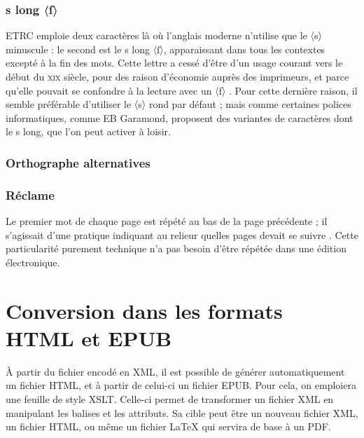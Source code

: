 \subsubsection{s long 〈ſ〉}
ETRC emploie deux caractères là où l'anglais moderne n'utilise que le 〈s〉 minuscule : le second est le s long 〈ſ〉, apparaissant dans tous les contextes excepté à la fin des mots.
Cette lettre a cessé d'être d'un usage courant vers le début du \textsc{xix}\ieme{} siècle, pour des raison d'économie auprès des imprimeurs, et parce qu'elle pouvait se confondre à la lecture avec un 〈f〉 \parencite{west_rules_2006}.
Pour cette dernière raison, il semble préférable d'utiliser le 〈s〉 rond par défaut ; mais comme certaines polices informatiques, comme EB Garamond, proposent des variantes de caractères dont le s long, que l'on peut activer à loisir.
\subsubsection{Orthographe alternatives}

\subsubsection{Réclame}
Le premier mot de chaque page est répété au bas de la page précédente ; il s'agissait d'une pratique indiquant au relieur quelles pages devait se suivre \parencite{roberts_catchword_1982}.
Cette particularité purement technique n'a pas besoin d'être répétée dans une édition électronique.
\section{Conversion dans les formats HTML et EPUB}\label{MethodConv}
À partir du fichier encodé en XML, il est possible de générer automatiquement un fichier HTML, et à partir de celui-ci un fichier EPUB.
Pour cela, on emploiera une feuille de style XSLT.
Celle-ci permet de transformer un fichier XML en manipulant les balises et les attributs.
Sa cible peut être un nouveau fichier XML, un fichier HTML, ou même un fichier \LaTeX{} qui servira de base à un PDF.